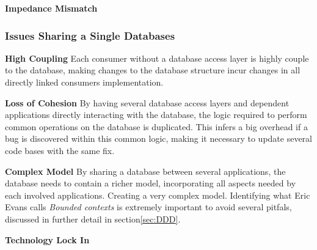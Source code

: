 \textbf{Impedance Mismatch}

\subsubsection{Issues Sharing a Single Databases}

\textbf{High Coupling}
Each consumer without a database access layer is highly couple to the database, making changes to the database structure incur changes in all directly linked consumers implementation.

\textbf{Loss of Cohesion}
By having several database access layers and dependent applications directly interacting with the database, the logic required to perform common operations on the database is duplicated. This infers a big overhead if a bug is discovered within this common logic, making it necessary to update several code bases with the same fix.

\textbf{Complex Model}
By sharing a database between several applications, the database needs to contain a richer model, incorporating all aspects needed by each involved applications. Creating a very complex model\cite[p.~6]{sadalage2012nosql}. Identifying what Eric Evans calls \textit{Bounded contexts} is extremely important to avoid several pitfals, discussed in further detail in section\ref{sec:DDD}.

\textbf{Technology Lock In}



